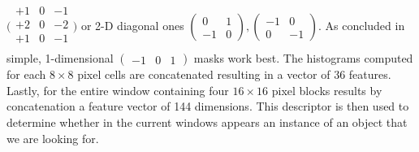 $
\bigl(
\begin{smallmatrix}
	+1 & 0 & -1 \\
	+2 & 0 & -2 \\
	+1 & 0 & -1 \\
\end{smallmatrix}
\bigr)
$ or 2-D diagonal ones 
$
(
\begin{smallmatrix}
	 0 & 1\\
    -1 & 0
\end{smallmatrix}
),
(
\begin{smallmatrix}
	-1 & 0\\
	 0 & -1
\end{smallmatrix}
)
$. As concluded in \cite{DalalTriggs05} simple, 1-dimensional $(\begin{smallmatrix}
-1 & 0 & 1
\end{smallmatrix})$ masks work best. The histograms computed for each $8\times8$ pixel cells are concatenated resulting in a vector of 36 features. Lastly, for the entire window containing four $16\times16$ pixel blocks results by concatenation a feature vector of 144 dimensions.
This descriptor is then used to determine whether in the current windows appears an instance of an object that we are looking for.
